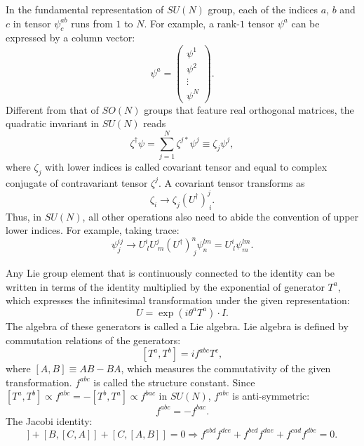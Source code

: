 \documentclass[12pt]{article}
\begin{document}
	In the fundamental representation of $SU(N)$ group, each of the indices $a$, $b$ and $c$ in tensor $\psi^{ab}_{c}$ runs from $1$ to $N$. For example, a rank-$1$ tensor $\psi^a$ can be expressed by a column vector:
	\begin{equation}
		\psi^a = \begin{pmatrix}
			\psi^1 \\
			\psi^2 \\
			\vdots\\
			\psi^N
		\end{pmatrix}.
	\end{equation}
	Different from that of $SO(N)$ groups that feature real orthogonal matrices, the quadratic invariant in $SU(N)$ reads
	\begin{equation}
		\zeta^\dagger\psi = \sum_{j=1}^N\zeta^{j*}\psi^j \equiv \zeta_j\psi^j,
	\end{equation}
	where $\zeta_j$ with lower indices is called covariant tensor and equal to complex conjugate of contravariant tensor $\zeta^j$. A covariant tensor transforms as
	\begin{equation}
		\zeta_i \rightarrow \zeta_j(U^\dagger)^{j}_{\  i}.
	\end{equation}
	Thus, in $SU(N)$, all other operations also need to abide the convention of upper lower indices. For example, taking trace:
	\begin{equation}
		\psi^{ij}_j \rightarrow U^i_{\ l}U^{j}_{\ m}(U^\dagger)^n_{\ j}\psi^{lm}_n = U^i_{\ l}\psi^{lm}_m.
	\end{equation}
	
	
	
	
	
	Any Lie group element that is continuously connected to the identity can be written in terms of the identity multiplied by the exponential of generator $T^a$, which expresses the infinitesimal transformation under the given representation:
	\begin{equation}
		U = \exp(i\theta^aT^a) \cdot I.
	\end{equation}
	The algebra of these generators is called a Lie algebra. Lie algebra is defined by commutation relations of the generators:
	\begin{equation}
		\left[ T^a , T^b \right] = if^{abc}T^c,
	\end{equation}
	where $[A,B] \equiv AB-BA$, which measures the commutativity of the given transformation. $f^{abc}$ is called the structure constant. Since $[T^a, T^b] \propto f^{abc} = -[T^b, T^a] \propto f^{bac}$ in $SU(N)$, $f^{abc}$ is anti-symmetric:
	\begin{equation}
		f^{abc} = -f^{bac}.
	\end{equation}
	The Jacobi identity:
	\begin{equation}
		[A, [B, C]] + [B, [C, A]] + [C, [A, B]] = 0 \Rightarrow f^{abd}f^{dce} + f^{bcd}f^{dae} + f^{cad}f^{dbe} = 0.
	\end{equation}
	
\end{document}
